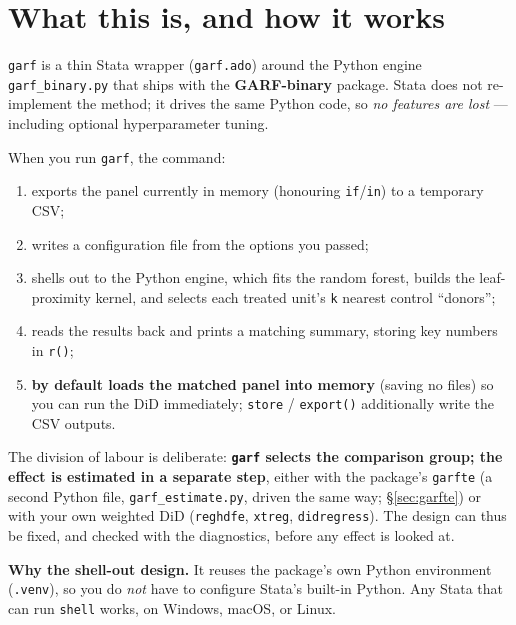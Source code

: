 \documentclass[11pt,a4paper]{article}
\newcommand{\code}[1]{\texttt{#1}}
\begin{document}
{\small\tableofcontents}
\vspace{0.6em}

\section{What this is, and how it works}

\code{garf} is a thin Stata wrapper (\code{garf.ado}) around the Python engine
\code{garf\_binary.py} that ships with the \textbf{GARF-binary} package. Stata does not
re-implement the method; it drives the same Python code, so \emph{no features are lost} ---
including optional hyperparameter tuning.

When you run \code{garf}, the command:
\begin{enumerate}[leftmargin=1.5em,itemsep=1pt,topsep=2pt]
\item exports the panel currently in memory (honouring \code{if}/\code{in}) to a temporary CSV;
\item writes a configuration file from the options you passed;
\item shells out to the Python engine, which fits the random forest, builds the leaf-proximity
      kernel, and selects each treated unit's \code{k} nearest control ``donors'';
\item reads the results back and prints a matching summary, storing key numbers in \code{r()};
\item \textbf{by default loads the matched panel into memory} (saving no files) so you can run
      the DiD immediately; \code{store} / \code{export()} additionally write the CSV outputs.
\end{enumerate}

The division of labour is deliberate: \textbf{\code{garf} selects the comparison group; the
effect is estimated in a separate step}, either with the package's \code{garfte} (a second Python
file, \code{garf\_estimate.py}, driven the same way; \S\ref{sec:garfte}) or with your own weighted
DiD (\code{reghdfe}, \code{xtreg}, \code{didregress}). The design can thus be fixed, and checked
with the diagnostics, before any effect is looked at.

\medskip
\noindent\textbf{Why the shell-out design.} It reuses the package's own Python environment
(\code{.venv}), so you do \emph{not} have to configure Stata's built-in Python. Any Stata that
can run \code{shell} works, on Windows, macOS, or Linux.
\end{document}
